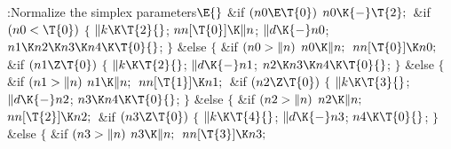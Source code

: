 \B{}:Normalize the simplex parameters\X${}\E{}$\6
\&{if} ${}(\\{n0}\E\T{0}){}$\1\5
${}\\{n0}\K{-}\T{2};{}$\2\6
\&{if} ${}(\\{n0}<\T{0}){}$\5
${}\{{}$\5
\1${}\|k\K\T{2}{}$;\5
${}\\{nn}[\T{0}]\K\|n{}$;\5
${}\|d\K{-}\\{n0}{}$;\5
${}\\{n1}\K\\{n2}\K\\{n3}\K\\{n4}\K\T{0}{}$;\5
${}\}{}$\2\6
\&{else}\5
${}\{{}$\1\6
\&{if} ${}(\\{n0}>\|n){}$\1\5
${}\\{n0}\K\|n;{}$\2\6
${}\\{nn}[\T{0}]\K\\{n0};{}$\6
\&{if} ${}(\\{n1}\Z\T{0}){}$\5
${}\{{}$\5
\1${}\|k\K\T{2}{}$;\5
${}\|d\K{-}\\{n1}{}$;\5
${}\\{n2}\K\\{n3}\K\\{n4}\K\T{0}{}$;\5
${}\}{}$\2\6
\&{else}\5
${}\{{}$\1\6
\&{if} ${}(\\{n1}>\|n){}$\1\5
${}\\{n1}\K\|n;{}$\2\6
${}\\{nn}[\T{1}]\K\\{n1};{}$\6
\&{if} ${}(\\{n2}\Z\T{0}){}$\5
${}\{{}$\5
\1${}\|k\K\T{3}{}$;\5
${}\|d\K{-}\\{n2}{}$;\5
${}\\{n3}\K\\{n4}\K\T{0}{}$;\5
${}\}{}$\2\6
\&{else}\5
${}\{{}$\1\6
\&{if} ${}(\\{n2}>\|n){}$\1\5
${}\\{n2}\K\|n;{}$\2\6
${}\\{nn}[\T{2}]\K\\{n2};{}$\6
\&{if} ${}(\\{n3}\Z\T{0}){}$\5
${}\{{}$\5
\1${}\|k\K\T{4}{}$;\5
${}\|d\K{-}\\{n3}{}$;\5
${}\\{n4}\K\T{0}{}$;\5
${}\}{}$\2\6
\&{else}\5
${}\{{}$\1\6
\&{if} ${}(\\{n3}>\|n){}$\1\5
${}\\{n3}\K\|n;{}$\2\6
${}\\{nn}[\T{3}]\K\\{n3};{}$\6
